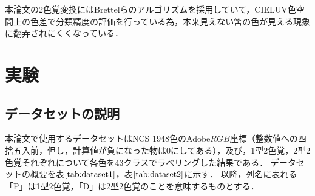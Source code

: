 \documentclass[uplatex,paper=a4,fontsize=4.0truemm,jafontsize=4.0truemm,head_space=30.0truemm,foot_space=30.0truemm,baselineskip=8.0truemm,line_length=40zw,gutter=25.0truemm,oneside,openany,fleqn,hanging_panctuation,open_bracket_pos=nibu_tentsuki,dvipdfmx,jis2004,book,titlepage]{jlreq}
\theoremstyle{mystyle}
\newcommand{\mathdisplaystyle}[1]{\(\displaystyle{#1}\)}
\newcommand{\Reference}[1]{\mathdisplaystyle{\ref{#1}}}
\begin{document}
		本論文の2色覚変換にはBrettelらのアルゴリズムを採用していて，CIELUV色空間上の色差で分類精度の評価を行っている為，本来見えない筈の色が見える現象に翻弄されにくくなっている．
	\chapter{実験}
		\section{データセットの説明}
			本論文で使用するデータセットはNCS 1948色のAdobe\mathdisplaystyle{RGB}座標（整数値への四捨五入前，但し，計算値が負になった物は0にしてある），及び，1型2色覚，2型2色覚それぞれについて各色を43クラスでラベリングした結果である．
			データセットの概要を表\Reference{tab:dataset1}，表\Reference{tab:dataset2}に示す．
			以降，列名に表れる「P」は1型2色覚，「D」は2型2色覚のことを意味するものとする．
\end{document}
